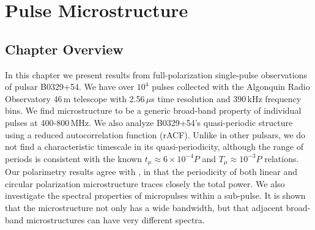 \chapter{Pulse Microstructure}
\label{chapter:microstructure}



\section{Chapter Overview}
In this chapter we present results from full-polarization  
single-pulse observations of pulsar B0329+54. 
We have over $10^4$ pulses 
collected with the Algonquin Radio Observatory 46\,m telescope
with 2.56\,$\mu$s time resolution and 390\,kHz 
frequency bins. 
We find microstructure to be a generic broad-band property of 
individual pulses at 400-800\,MHz.
We also analyze B0329+54's quasi-periodic structure
using a reduced autocorrelation function (rACF). 
Unlike in other pulsars, 
we do not find a characteristic timescale in its quasi-periodicity, 
although the range of periods is consistent with the known
$t_{\mu} \approx 6 \times 10^{-4} P$ and 
$T_{\mu} \approx 10^{-3} P$ relations. 
Our polarimetry results agree with 
\citet{2015ApJ...806..236M}, in that the periodicity 
of both linear and circular polarization microstructure 
traces closely the total power. 
We also investigate the spectral properties 
of micropulses within a sub-pulse. It is shown that the microstructure not 
only has a wide bandwidth, but that adjacent broad-band 
microstructures can have very different spectra. 



